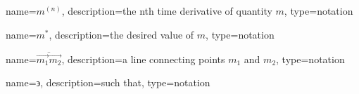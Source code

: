 	\newcommand{\tdern}[2]{\ensuremath{{#1}^{(#2)}}}
	{%
		name=\tdern{m}{n},
		description=the nth time derivative of quantity $m$,
		type=notation
	}

	\newcommand{\desired}[1]{\ensuremath{{#1}^{*}}}
	{%
		name=\desired{m},
		description=the desired value of $m$,
		type=notation
	}

	\newcommand{\vecline}[2]{\ensuremath{\overline{#1#2}}}
	{%
		name=\ensuremath{\vecline{\vec{m_1}}{\vec{m_2}}},
		description=a line connecting points $m_1$ and $m_2$,
		type=notation
	}

	{%
		name={\ensuremath{\backepsilon}},
		description=such that,
		type=notation
	}
	\newcommand{\suchthat}{\gls{not:suchthat}}

	\DeclarePairedDelimiter{\ceil}{\lceil}{\rceil}
	\DeclarePairedDelimiter{\floor}{\lfloor}{\rfloor}
